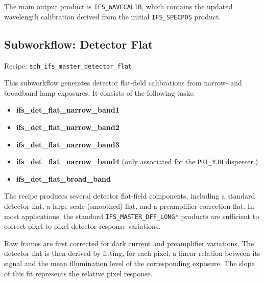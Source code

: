 The main output product is \texttt{IFS\_WAVECALIB}, which contains the
updated wavelength calibration derived from the initial
\texttt{IFS\_SPECPOS} product.





\subsection{Subworkflow: Detector Flat}

Recipe:
\texttt{sph\_ifs\_master\_detector\_flat}

This subworkflow generates detector flat-field calibrations from narrow-
and broadband lamp exposures. It consists of the following tasks:

\begin{itemize}
\item \textbf{ifs\_det\_flat\_narrow\_band1}
\item \textbf{ifs\_det\_flat\_narrow\_band2}
\item \textbf{ifs\_det\_flat\_narrow\_band3}
\item \textbf{ifs\_det\_flat\_narrow\_band4} (only associated for the \texttt{PRI\_YJH} disperser.)
\item \textbf{ifs\_det\_flat\_broad\_band}
\end{itemize}

The recipe produces several detector flat-field components, including a
standard detector flat, a large-scale (smoothed) flat, and a
preamplifier-correction flat. In most applications, the standard
\texttt{IFS\_MASTER\_DFF\_LONG*} products are sufficient to correct
pixel-to-pixel detector response variations.

Raw frames are first corrected for dark current and preamplifier
variations. The detector flat is then derived by fitting, for each pixel,
a linear relation between its signal and the mean illumination level of
the corresponding exposure. The slope of this fit represents the relative
pixel response.

